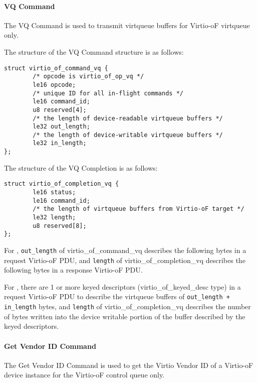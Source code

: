 \paragraph{VQ Command}\label{sec:Virtio Transport Options / Virtio Over Fabrics / Commands Definition / Opcodes / VQ Command}
The VQ Command is used to transmit virtqueue buffers for Virtio-oF virtqueue only.

The structure of the VQ Command structure is as follows:
\begin{lstlisting}
struct virtio_of_command_vq {
        /* opcode is virtio_of_op_vq */
        le16 opcode;
        /* unique ID for all in-flight commands */
        le16 command_id;
        u8 reserved[4];
        /* the length of device-readable virtqueue buffers */
        le32 out_length;
        /* the length of device-writable virtqueue buffers */
        le32 in_length;
};
\end{lstlisting}

The structure of the VQ Completion is as follows:
\begin{lstlisting}
struct virtio_of_completion_vq {
        le16 status;
        le16 command_id;
        /* the length of virtqueue buffers from Virtio-oF target */
        le32 length;
        u8 reserved[8];
};
\end{lstlisting}

For ,
\texttt{out_length} of virtio_of_command_vq describes the following bytes in a request Virtio-oF PDU,
and \texttt{length} of virtio_of_completion_vq describes the following bytes in a response Virtio-oF PDU.

For ,
there are 1 or more keyed descriptors (virtio_of_keyed_desc type) in a request Virtio-oF PDU to describe the virtqueue buffers of \texttt{out_length + in_length} bytes,
and \texttt{length} of virtio_of_completion_vq describes the number of bytes written into the device writable portion of the buffer described by the keyed descriptors.

\paragraph{Get Vendor ID Command}\label{sec:Virtio Transport Options / Virtio Over Fabrics / Commands Definition / Opcodes / Get Vendor ID Command}
The Get Vendor ID Command is used to get the Virtio Vendor ID of a Virtio-oF device instance for the Virtio-oF control queue only.

